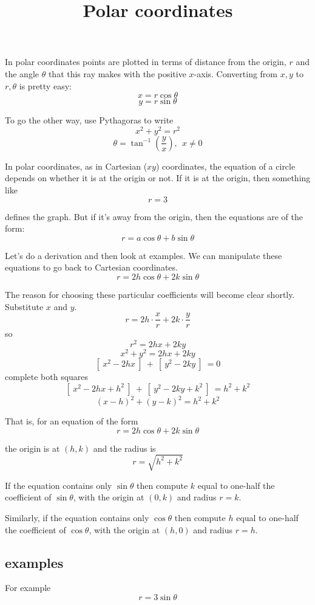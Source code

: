 \documentclass[11pt, oneside]{article}
\title{Polar coordinates}
\date{}
\begin{document}
\maketitle
\Large

In polar coordinates points are plotted in terms of distance from the origin, $r$ and the angle $\theta$ that this ray makes with the positive $x$-axis.  Converting from $x,y$ to $r, \theta$ is pretty easy:
\[ x = r \cos \theta \]
\[ y = r \sin \theta \]

To go the other way, use Pythagoras to write 
\[ x^2 + y^2 = r^2 \]
\[ \theta = \tan^{-1} (\frac{y}{x}), \ \ x \ne 0 \]

In polar coordinates, as in Cartesian ($xy$) coordinates, the equation of a circle depends on whether it is at the origin or not.  If it is at the origin, then something like
\[ r = 3 \]

defines the graph.  But if it's away from the origin, then the equations are of the form:
\[ r = a \cos \theta + b \sin \theta \]

Let's do a derivation and then look at examples.  We can manipulate these equations to go back to Cartesian coordinates.
\[ r = 2h \cos \theta + 2k \sin \theta \]

The reason for choosing these particular coefficients will become clear shortly.  Substitute  $x$ and $y$.
\[ r = 2h \cdot \frac{x}{r} + 2k \cdot \frac{y}{r} \]
so 
\[ r^2 = 2hx + 2ky \]
\[ x^2 + y^2 = 2hx + 2ky \]
\[ [ \ x^2 - 2hx  \ ] \ + \  [ \ y^2 - 2ky  \ ]  \ = 0 \]
complete both squares
\[ [ \ x^2 - 2hx + h^2 \ ] \ + \  [ \ y^2 - 2ky + k^2 \ ]  \ = h^2 + k^2 \]
\[ (x - h)^2 + (y - k)^2 = h^2 + k^2 \]

That is, for an equation of the form
\[ r = 2h \cos \theta + 2k \sin \theta \]

the origin is at $(h,k)$ and the radius is
\[ r = \sqrt{h^2 + k^2} \]

If the equation contains only $\sin \theta$ then compute $k$ equal to one-half the coefficient of $\sin \theta$, with the origin at $(0,k)$ and radius $r = k$.

Similarly, if the equation contains only $\cos \theta$ then compute $h$ equal to one-half the coefficient of $\cos \theta$, with the origin at $(h,0)$ and radius $r = h$.

\subsection*{examples}
For example
\[ r = 3 \sin \theta \]
\end{document}
